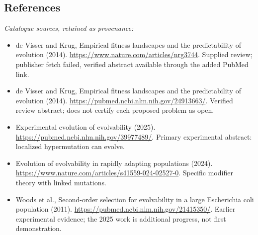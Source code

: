 \documentclass[11pt]{article}
\begin{document}
\subsection{References}
\noindent\emph{Catalogue sources, retained as provenance:}
\begin{itemize}
\item de Visser and Krug, Empirical fitness landscapes and the predictability of evolution (2014). \url{https://www.nature.com/articles/nrg3744}. Supplied review; publisher fetch failed, verified abstract available through the added PubMed link.
\item de Visser and Krug, Empirical fitness landscapes and the predictability of evolution (2014). \url{https://pubmed.ncbi.nlm.nih.gov/24913663/}. Verified review abstract; does not certify each proposed problem as open.
\item Experimental evolution of evolvability (2025). \url{https://pubmed.ncbi.nlm.nih.gov/39977489/}. Primary experimental abstract: localized hypermutation can evolve.
\item Evolution of evolvability in rapidly adapting populations (2024). \url{https://www.nature.com/articles/s41559-024-02527-0}. Specific modifier theory with linked mutations.
\item Woods et al., Second-order selection for evolvability in a large Escherichia coli population (2011). \url{https://pubmed.ncbi.nlm.nih.gov/21415350/}. Earlier experimental evidence; the 2025 work is additional progress, not first demonstration.
\end{itemize}
\clearpage


\appendix
\end{document}
